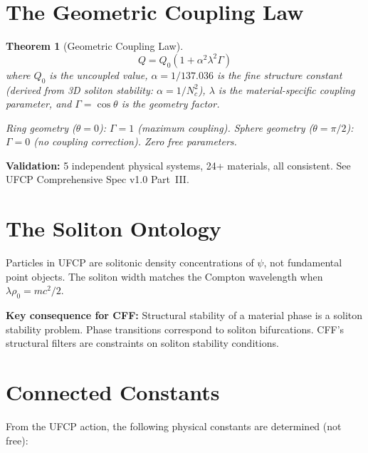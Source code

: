 \documentclass[11pt, a4paper]{article}
\newtheorem{theorem}{Theorem}[section]
\begin{document}
\section{The Geometric Coupling Law}

\begin{theorem}[Geometric Coupling Law]
\label{thm:gcl}
\begin{equation}
  \boxed{Q = Q_0\left(1 + \alpha^2 \lambda^2 \Gamma\right)}
\end{equation}
where $Q_0$ is the uncoupled value, $\alpha = 1/137.036$ is
the fine structure constant (derived from 3D soliton stability:
$\alpha = 1/N_c^2$), $\lambda$ is the material-specific coupling
parameter, and $\Gamma = \cos\theta$ is the geometry factor.

Ring geometry ($\theta = 0$): $\Gamma = 1$ (maximum coupling).
Sphere geometry ($\theta = \pi/2$): $\Gamma = 0$ (no coupling
correction). Zero free parameters.
\end{theorem}

\textbf{Validation:} 5 independent physical systems, 24+
materials, all consistent. See UFCP Comprehensive Spec v1.0
Part~III.

\section{The Soliton Ontology}

Particles in UFCP are solitonic density concentrations of
$\psi$, not fundamental point objects. The soliton width matches
the Compton wavelength when $\lambda\rho_0 = mc^2/2$.

\textbf{Key consequence for CFF:} Structural stability of a
material phase is a soliton stability problem. Phase transitions
correspond to soliton bifurcations. CFF's structural filters
are constraints on soliton stability conditions.

\section{Connected Constants}

From the UFCP action, the following physical constants are
determined (not free):
\end{document}
